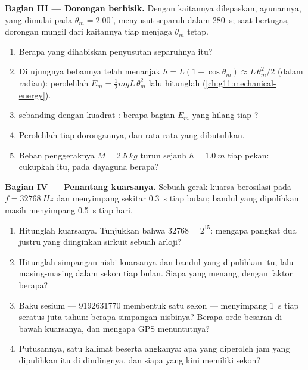\begin{problem}
\medskip
\noindent\textbf{Bagian III --- Dorongan berbisik.} Dengan kaitannya
dilepaskan, ayunannya, yang dimulai pada  $\theta_m = 2.00^\circ$,
menyusut separuh  dalam \qty{280}{s}; saat bertugas, dorongan
mungil dari kaitannya tiap  menjaga $\theta_m$ tetap.
\begin{enumerate}[resume]
  \item Berapa  yang dihabiskan penyusutan separuhnya itu?
  \item Di ujungnya bebannya telah menanjak $h = L(1 - \cos\theta_m)
        \approx L\,\theta_m^2/2$ (dalam radian): perolehlah $E_m = \tfrac12
        m g L\,\theta_m^2$ lalu hitunglah
        (\cref{ch:g11:mechanical-energy}).
  \item {} sebanding dengan kuadrat : berapa bagian
        $E_m$ yang hilang tiap ?
  \item Perolehlah  tiap dorongannya, dan  rata-rata yang dibutuhkan.
  \item Beban penggeraknya $M = \qty{2.5}{kg}$ turun sejauh $h =
        \qty{1.0}{m}$ tiap pekan: cukupkah  itu, pada dayaguna berapa?
\end{enumerate}

\medskip
\noindent\textbf{Bagian IV --- Penantang kuarsanya.} Sebuah gerak
kuarsa berosilasi pada $f = \qty{32768}{Hz}$ dan menyimpang sekitar
\qty{0.3}{s} tiap bulan; bandul yang dipulihkan masih menyimpang
\qty{0.5}{s} tiap hari.
\begin{enumerate}[resume]
  \item Hitunglah  kuarsanya. Tunjukkan bahwa $\num{32768} = 2^{15}$: mengapa
        pangkat dua justru yang diinginkan sirkuit sebuah arloji?
  \item Hitunglah simpangan nisbi kuarsanya dan bandul yang dipulihkan itu,
        lalu masing-masing dalam sekon tiap bulan. Siapa yang menang, dengan faktor berapa?
  \item Baku sesium --- \num{9192631770}  membentuk satu
        sekon --- menyimpang \qty{1}{s} tiap seratus juta tahun: berapa
        simpangan nisbinya? Berapa orde besaran di bawah kuarsanya,
        dan mengapa GPS menuntutnya?
  \item Putusannya, satu kalimat beserta angkanya: apa yang diperoleh jam
        yang dipulihkan itu di dindingnya, dan siapa yang kini memiliki sekon?
\end{enumerate}
\end{problem}
